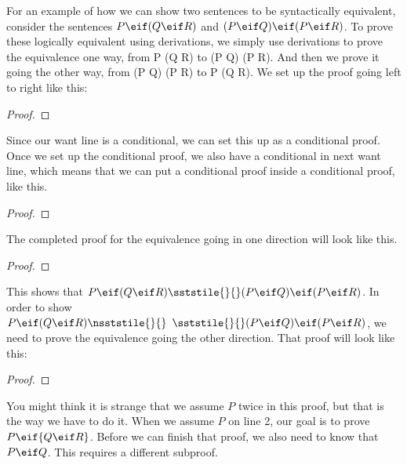 For an example of how we can show two sentences to be syntactically equivalent, consider the sentences $P \eif (Q \eif R)$ and $(P \eif Q) \eif (P \eif R)$. \label{theorem_DistributionOfImplicationOverImplication} To prove these logically equivalent using derivations, we simply use derivations to prove the equivalence one way, from P \eif (Q \eif R) to (P \eif Q) \eif (P \eif R). And then we prove it going the other way, from (P \eif Q) \eif (P \eif R) to P \eif (Q \eif R). We set up the proof going left to right like this: 

\begin{proof}
	
\end{proof}

Since our want line is a conditional, we can set this up as a conditional proof. Once we set up the conditional proof, we also have a conditional in next want line, which means that we can put a conditional proof inside a conditional proof, like this.

\begin{proof}
	
	\open
		
		\open
			
\end{proof}

The completed proof for the equivalence going in one direction will look like this.

\begin{proof}
	
	\open
		
		\open
			
		 
			
		 
		\close
	 
	\close
{} 
\end{proof}

This shows that $P \eif (Q \eif R) \sststile{}{} (P \eif Q) \eif (P \eif R)$. In order to show $P \eif (Q \eif R) \nsststile{}{} \hspace{.5em} \sststile{}{} (P \eif Q) \eif (P \eif R)$, we need to prove the equivalence going the other direction. That proof will look like this:

\begin{proof}
	
	\open
	 
		\open
		 
			\open
			 
			 
			\close
		 
		 
		 
		\close	
{} 
\close
{} 
\end{proof}
You might think it is strange that we assume $P$ twice in this proof, but that is the way we have to do it. When we assume $P$ on line 2, our goal is to prove $P \eif {Q \eif R}$. Before we can finish that proof, we also need to know that $P \eif Q$. This requires a different subproof. 

